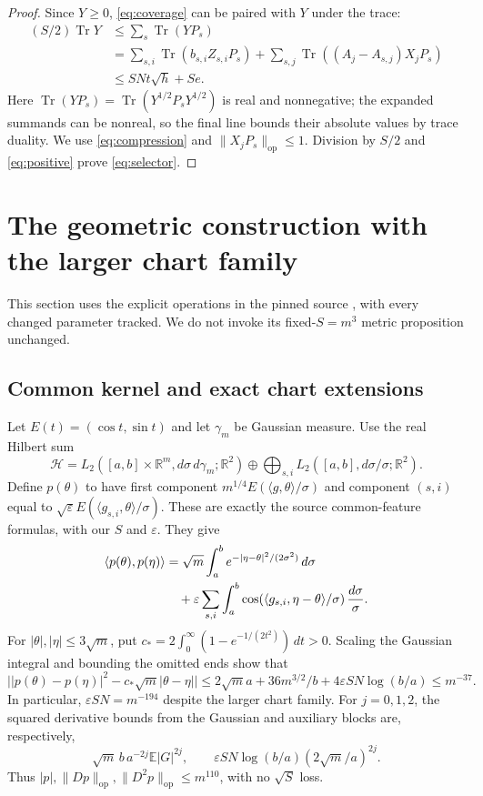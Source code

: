 \documentclass[11pt]{article}
\theoremstyle{remark}\newtheorem{remark}[theorem]{Remark}
\numberwithin{equation}{section}
\newcommand{\R}{\mathbb R}\newcommand{\C}{\mathbb C}
\newcommand{\E}{\mathbb E}\newcommand{\Prob}{\mathbb P}
\newcommand{\HH}{\mathcal H}\newcommand{\op}{\mathrm{op}}
\DeclareMathOperator{\Tr}{Tr}\DeclareMathOperator{\TV}{TV}
\newcommand{\ip}[2]{\langle #1,#2\rangle}
\newcommand{\norm}[1]{\lVert #1\rVert}
\begin{document}
\begin{proof}
Since $Y\ge0$, \eqref{eq:coverage} can be paired with $Y$ under the trace:
\begin{align*}
 (S/2)\Tr Y
 &\le\sum_s\Tr(YP_s)\\
 &=\sum_{s,i}\Tr(b_{s,i}Z_{s,i}P_s)
   +\sum_{s,j}\Tr((A_j-A_{s,j})X_jP_s)\\
 &\le SNt\sqrt h+Se.
\end{align*}
Here $\Tr(YP_s)=\Tr(Y^{1/2}P_sY^{1/2})$ is real and nonnegative;
the expanded summands can be nonreal, so the final line bounds their
absolute values by trace duality. We use \eqref{eq:compression} and
$\norm{X_jP_s}_{\op}\le1$. Division by $S/2$ and \eqref{eq:positive}
prove \eqref{eq:selector}.
\end{proof}

\section{The geometric construction with the larger chart family}
\label{sec:geometry}
This section uses the explicit operations in the pinned source
\cite{source}, with every changed parameter tracked. We do not invoke its
fixed-$S=m^3$ metric proposition unchanged.

\subsection{Common kernel and exact chart extensions}
Let $E(t)=(\cos t,\sin t)$ and let $\gamma_m$ be Gaussian measure. Use the
real Hilbert sum
\[
 \HH=L_2([a,b]\times\R^m,d\sigma\,d\gamma_m;\R^2)
 \oplus\bigoplus_{s,i}L_2([a,b],d\sigma/\sigma;\R^2).
\]
Define $p(\theta)$ to have first component
$m^{1/4}E(\ip g\theta/\sigma)$ and component $(s,i)$ equal to
$\sqrt\varepsilon E(\ip{g_{s,i}}\theta/\sigma)$. These are exactly the
source common-feature formulas, with our $S$ and $\varepsilon$. They give
\begin{align}
 \ip{p(\theta)}{p(\eta)}
 &=\sqrt m\int_a^b e^{-|\eta-\theta|^2/(2\sigma^2)}\,d\sigma\notag\\
 &\quad+\varepsilon\sum_{s,i}\int_a^b
       \cos(\ip{g_{s,i}}{\eta-\theta}/\sigma)\,\frac{d\sigma}{\sigma}.
       \label{eq:kernel}
\end{align}
For $|\theta|,|\eta|\le3\sqrt m$, put
$c_*=2\int_0^\infty(1-e^{-1/(2t^2)})\,dt>0$. Scaling the Gaussian
integral and bounding the omitted ends show that
\begin{equation}\label{eq:distanceerror}
 \big||p(\theta)-p(\eta)|^2-c_*\sqrt m|\theta-\eta|\big|
 \le 2\sqrt m a+36m^{3/2}/b+4\varepsilon SN\log(b/a)
 \le m^{-37}.
\end{equation}
In particular, $\varepsilon SN=m^{-194}$ despite the larger chart family.
For $j=0,1,2$, the squared derivative bounds from the Gaussian and
auxiliary blocks are, respectively,
\[
 \sqrt m\,b\,a^{-2j}\E|G|^{2j},\qquad
 \varepsilon SN\log(b/a)(2\sqrt m/a)^{2j}.
\]
Thus $|p|,\norm{Dp}_{\op},\norm{D^2p}_{\op}\le m^{110}$, with no
$\sqrt S$ loss.
\end{document}
